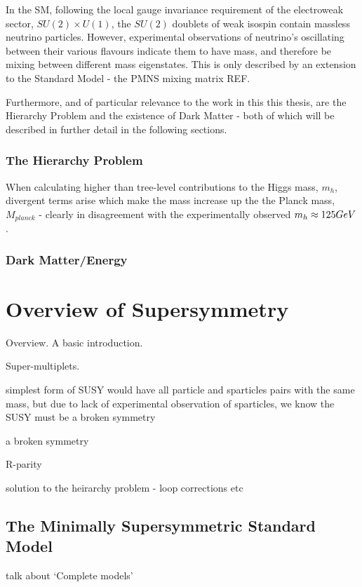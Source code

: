 In the SM, following the local gauge invariance requirement of the electroweak
sector, $SU(2)\times U(1)$, the $SU(2)$ doublets of weak isospin contain
massless neutrino particles. However, experimental observations of neutrino's
oscillating between their various flavours indicate them to have mass, and
therefore be mixing between different mass eigenstates. This is only described
by an extension to the Standard Model - the PMNS mixing matrix REF.

Furthermore, and of particular relevance to the work in this this thesis, are
the Hierarchy Problem and the existence of Dark Matter - both of which will be
described in further detail in the following sections.

\subsubsection{The Hierarchy Problem}

When calculating higher than tree-level contributions to the Higgs mass, $m_h$,
divergent terms arise which make the mass increase up the the Planck mass,
$M_{planck}$ - clearly in disagreement with the experimentally observed
$m_h \approx 125 GeV$.

\subsubsection{Dark Matter/Energy}


\section{Overview of Supersymmetry}  %
\label{sec:theory_overview}
Overview. A basic introduction.

Super-multiplets.

simplest form of SUSY would have all particle and sparticles pairs with the same
mass, but due to lack of experimental observation of sparticles, we know the
SUSY must be a broken symmetry

a broken symmetry

R-parity

solution to the heirarchy problem - loop corrections etc

\subsection{The Minimally Supersymmetric Standard Model}
talk about `Complete models'

